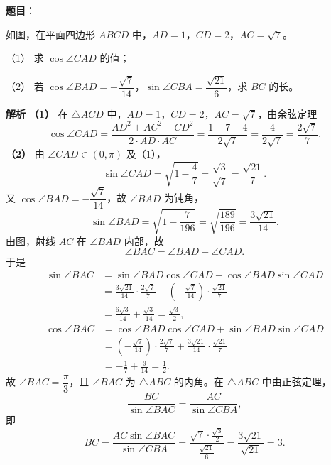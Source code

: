 \begin{answer}

\textbf{题目}：

如图，在平面四边形 $ABCD$ 中，$AD=1$，$CD=2$，$AC=\sqrt7$。
\nopagebreak[4]
\begin{center}\end{center}
\nopagebreak[4]
（1） 求 $\cos\angle CAD$ 的值；

（2） 若 $\cos\angle BAD=-\dfrac{\sqrt7}{14}$，$\sin\angle CBA=\dfrac{\sqrt{21}}6$，求 $BC$ 的长。

\textbf{解析}
\textbf{（1）} 在 $\triangle ACD$ 中，$AD=1$，$CD=2$，$AC=\sqrt7$，由余弦定理
\nopagebreak[4]
\[\cos\angle CAD=\frac{AD^2+AC^2-CD^2}{2\cdot AD\cdot AC}=\frac{1+7-4}{2\sqrt7}=\frac{4}{2\sqrt7}=\frac{2\sqrt7}7 .\]
\textbf{（2）} 由 $\angle CAD\in(0,\pi)$ 及（1），
\nopagebreak[4]
\[\sin\angle CAD=\sqrt{1-\frac47}=\frac{\sqrt3}{\sqrt7}=\frac{\sqrt{21}}7 .\]
又 $\cos\angle BAD=-\dfrac{\sqrt7}{14}$，故 $\angle BAD$ 为钝角，
\nopagebreak[4]
\[\sin\angle BAD=\sqrt{1-\frac7{196}}=\sqrt{\frac{189}{196}}=\frac{3\sqrt{21}}{14} .\]
由图，射线 $AC$ 在 $\angle BAD$ 内部，故
\nopagebreak[4]
\[\angle BAC=\angle BAD-\angle CAD .\]
于是
\nopagebreak[4]
\[\begin{aligned}
\sin\angle BAC&=\sin\angle BAD\cos\angle CAD-\cos\angle BAD\sin\angle CAD\\
&=\frac{3\sqrt{21}}{14}\cdot\frac{2\sqrt7}{7}-\left(-\frac{\sqrt7}{14}\right)\cdot\frac{\sqrt{21}}7\\
&=\frac{6\sqrt3}{14}+\frac{\sqrt3}{14}=\frac{\sqrt3}2 ,
\end{aligned}\]
\nopagebreak[4]
\[\begin{aligned}
\cos\angle BAC&=\cos\angle BAD\cos\angle CAD+\sin\angle BAD\sin\angle CAD\\
&=\left(-\frac{\sqrt7}{14}\right)\cdot\frac{2\sqrt7}7+\frac{3\sqrt{21}}{14}\cdot\frac{\sqrt{21}}7\\
&=-\frac17+\frac{9}{14}=\frac12 .
\end{aligned}\]
故 $\angle BAC=\dfrac\pi3$，且 $\angle BAC$ 为 $\triangle ABC$ 的内角。在 $\triangle ABC$ 中由正弦定理，
\nopagebreak[4]
\[\frac{BC}{\sin\angle BAC}=\frac{AC}{\sin\angle CBA},\]
即
\nopagebreak[4]
\[BC=\frac{AC\sin\angle BAC}{\sin\angle CBA}=\frac{\sqrt7\cdot\frac{\sqrt3}2}{\frac{\sqrt{21}}6}=\frac{3\sqrt{21}}{\sqrt{21}}=3 .\]



\end{answer}
